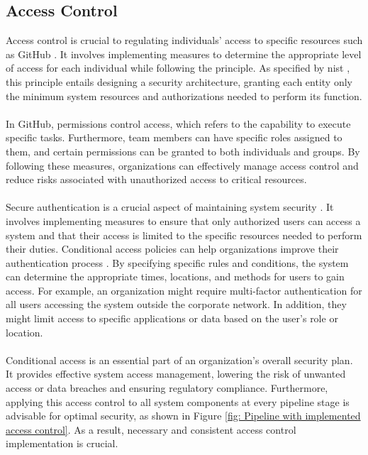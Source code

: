 \subsection{Access Control}
Access control is crucial to regulating individuals' access to specific resources such as GitHub \cite{accesscontroll}. It involves implementing measures to determine the appropriate level of access for each individual while following the  principle. As specified by \acrshort{nist} \cite{leastprivilege}, this principle entails designing a security architecture, granting each entity only the minimum system resources and authorizations needed to perform its function. 
\\~\\
In GitHub, permissions control access, which refers to the capability to execute specific tasks. Furthermore, team members can have specific roles assigned to them, and certain permissions can be granted to both individuals and groups. By following these measures, organizations can effectively manage access control and reduce risks associated with unauthorized access to critical resources. 
\\~\\
Secure authentication is a crucial aspect of maintaining system security \cite{iso27002}. It involves implementing measures to ensure that only authorized users can access a system and that their access is limited to the specific resources needed to perform their duties. Conditional access policies can help organizations improve their authentication process \cite{conditionalaccess}. By specifying specific rules and conditions, the system can determine the appropriate times, locations, and methods for users to gain access. For example, an organization might require multi-factor authentication for all users accessing the system outside the corporate network. In addition, they might limit access to specific applications or data based on the user's role or location.
\\~\\
Conditional access is an essential part of an organization's overall security plan. It provides effective system access management, lowering the risk of unwanted access or data breaches and ensuring regulatory compliance. Furthermore, applying this access control to all system components at every pipeline stage is advisable for optimal security, as shown in Figure \ref{fig: Pipeline with implemented access control}. As a result, necessary and consistent access control implementation is crucial.

